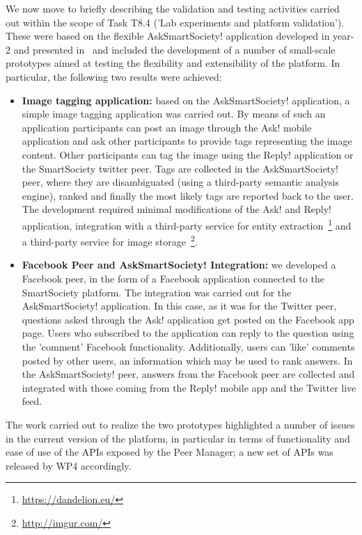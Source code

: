 We now move to briefly describing the validation and testing activities carried out within the scope of Task T8.4 ('Lab experiments and platform validation'). These were based on the flexible AskSmartSociety! application developed in year-2 and presented in~\cite{D8.2} and included the development of a number of small-scale prototypes aimed at testing the flexibility and extensibility of the platform. In particular, the following two results were achieved:
\begin{itemize}
\item {\bfseries Image tagging application:} based on the AskSmartSociety! application, a simple image tagging application was carried out. By means of such an application participants can post an image through the Ask! mobile application and ask other participants to provide tags representing the image content. Other participants can tag the image using the Reply! application or the SmartSociety twitter peer. Tags are collected in the AskSmartSociety! peer, where they are disambiguated (using a third-party semantic analysis engine), ranked and finally the most likely tags are reported back to the user. The development required minimal modifications of the Ask! and Reply! application, integration with a third-party service for entity extraction~\footnote{\url{https://dandelion.eu/}} and a third-party service for image storage~\footnote{\url{http://imgur.com/}}.
\item {\bfseries Facebook Peer and AskSmartSociety! Integration:} we developed a Facebook peer, in the form of a Facebook application connected to the SmartSociety platform. The integration was carried out for the AskSmartSociety! application. In this case, as it was for the Twitter peer, questions asked through the Ask! application get posted on the Facebook app page. Users who subscribed to the application can reply to the question using the 'comment' Facebook functionality. Additionally, users can 'like' comments posted by other users, an information which may be used to rank answers. In the AskSmartSociety! peer, answers from the Facebook peer are collected and integrated with those coming from the Reply! mobile app and the Twitter live feed. 
\end{itemize}
The work carried out to realize the two prototypes highlighted a number of issues in the current version of the platform, in particular in terms of functionality and ease of use of the APIs exposed by the Peer Manager; a new set of APIs was released by WP4 accordingly.